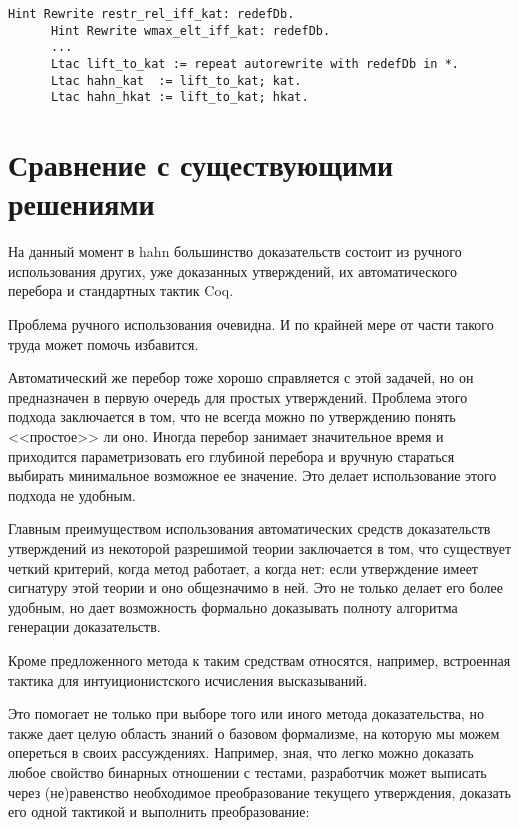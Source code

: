 \documentclass[times
              ,specification
              ,annotation
              ]{itmo-student-thesis}
\begin{document}
      \begin{lstlisting}[float=false, gobble=4,
        caption={Переопределение тактик \coqe{h(kat)}, для автоматической замены старых определений на новые}, label={lst:define_lift}]
      Hint Rewrite restr_rel_iff_kat: redefDb.
      Hint Rewrite wmax_elt_iff_kat: redefDb.
      ...
      Ltac lift_to_kat := repeat autorewrite with redefDb in *.
      Ltac hahn_kat  := lift_to_kat; kat.
      Ltac hahn_hkat := lift_to_kat; hkat.
      \end{lstlisting}

  \section{Сравнение с существующими решениями}

    На данный момент в hahn большинство доказательств состоит из ручного использования других, уже
    доказанных утверждений, их автоматического перебора и стандартных тактик Coq.

    Проблема ручного использования очевидна. И по крайней мере от части такого труда 
    может помочь избавится.

    Автоматический же перебор тоже хорошо справляется с этой задачей, но он предназначен в первую
    очередь для простых утверждений. Проблема этого подхода заключается в том, что не всегда можно по
    утверждению понять <<простое>> ли оно. Иногда перебор занимает значительное
    время и приходится параметризовать его глубиной перебора и вручную стараться выбирать
    минимальное возможное ее значение. Это делает использование этого подхода не удобным.

    Главным преимуществом использования автоматических средств доказательств утверждений из некоторой
    разрешимой теории заключается в том, что существует четкий критерий, когда метод работает, а когда
    нет: если утверждение имеет сигнатуру этой теории и оно общезначимо в ней. Это не только делает его
    более удобным, но дает возможность формально доказывать полноту алгоритма генерации доказательств.

    Кроме предложенного метода к таким средствам относятся, например, встроенная тактика 
    \cite{coq_man} для интуиционистского исчисления высказываний.

    Это помогает не только при выборе того или иного метода доказательства, но также дает целую область
    знаний о базовом формализме, на которую мы можем опереться в своих рассуждениях. Например, зная, что
    легко можно доказать любое свойство бинарных отношении с тестами, разработчик может выписать через
    (не)равенство необходимое преобразование текущего утверждения, доказать его одной тактикой
     и выполнить преобразование:
\end{document}
